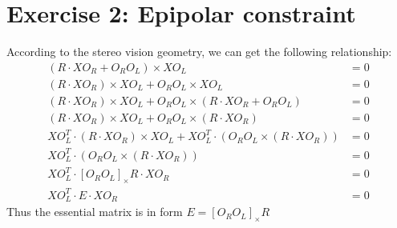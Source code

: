 \documentclass[12pt,letterpaper]{article}
\begin{document}
\section*{Exercise 2: Epipolar constraint}
According to the stereo vision geometry, we can get the following relationship:
\begin{equation*}
	\begin{split}
		(R\cdot XO_R + O_RO_L)\times XO_L &=0\\
		(R\cdot XO_R)\times XO_L + O_RO_L\times XO_L &=0\\
		(R\cdot XO_R)\times XO_L + O_RO_L\times (R\cdot XO_R +O_RO_L) &=0\\
		(R\cdot XO_R)\times XO_L + O_RO_L\times (R\cdot XO_R) &=0\\
		XO_L^T\cdot (R\cdot XO_R)\times XO_L + XO_L^T\cdot (O_RO_L\times (R\cdot XO_R)) &=0\\
		XO_L^T\cdot (O_RO_L\times (R\cdot XO_R)) &=0\\
		XO_L^T\cdot [O_RO_L]_{\times} R\cdot XO_R &=0\\
		XO_L^T\cdot E\cdot XO_R &=0
	\end{split}
\end{equation*}
Thus the essential matrix is in form $E= [O_RO_L]_{\times} R $
\end{document}
